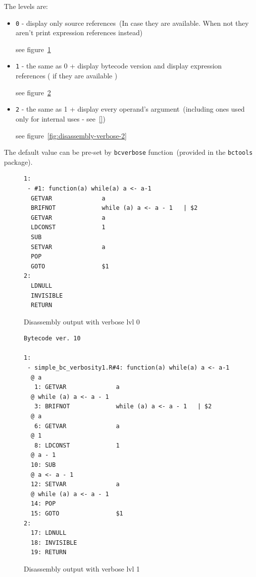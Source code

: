 \documentclass[thesis=M,english]{FITthesis}[2018/10/20]
\newcommand{\code}[1]{\texttt{#1}}
\begin{document}
The levels are:

\begin{itemize}
	\item \code{0} - display only source references~(In case they are available. When not they aren't print expression references instead)

	see figure~\ref{fig:disassembly-verbose-0}

	\item \code{1} - the same as 0 + display bytecode version and display expression references ( if they are available )

	see figure~\ref{fig:disassembly-verbose-1}

	\item \code{2} - the same as 1 + display every operand's argument~(including ones used only for internal uses - see~\ref{})

	see figure~\ref{fig:disassembly-verbose-2}

\end{itemize}

The default value can be pre-set by \code{bcverbose} function~(provided in the \code{bctools} package).

\begin{figure}[h]
\begin{lstlisting}
1:
 - #1: function(a) while(a) a <- a-1
  GETVAR              a
  BRIFNOT             while (a) a <- a - 1	 | $2
  GETVAR              a
  LDCONST             1
  SUB
  SETVAR              a
  POP
  GOTO                $1
2:
  LDNULL
  INVISIBLE
  RETURN
\end{lstlisting}
	\caption{Disassembly output with verbose lvl 0}\label{fig:disassembly-verbose-0}
\end{figure}

\begin{figure}[h]
\begin{lstlisting}
Bytecode ver. 10

1:
 - simple_bc_verbosity1.R#4: function(a) while(a) a <- a-1
  @ a
   1: GETVAR              a
  @ while (a) a <- a - 1
   3: BRIFNOT             while (a) a <- a - 1	 | $2
  @ a
   6: GETVAR              a
  @ 1
   8: LDCONST             1
  @ a - 1
  10: SUB
  @ a <- a - 1
  12: SETVAR              a
  @ while (a) a <- a - 1
  14: POP
  15: GOTO                $1
2:
  17: LDNULL
  18: INVISIBLE
  19: RETURN
\end{lstlisting}
	\caption{Disassembly output with verbose lvl 1}\label{fig:disassembly-verbose-1}
\end{figure}
\end{document}
